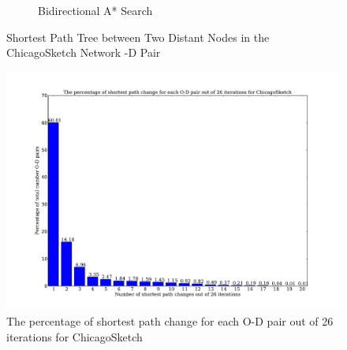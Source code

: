 \begin{figure}
\begin{subfigure}{.5\textwidth}
        \caption{Bidirectional A* Search}
        \label{fig:chicago_astar_bidirect}
    \end{subfigure}
    \vspace{1em}
    \caption{Shortest Path Tree between Two Distant Nodes in the ChicagoSketch Network -D Pair}
    \label{fig:long_sptree}
\end{figure}

\begin{figure}[H]
    \centering
    \includegraphics[width=\textwidth]{img/sp_change}
    \caption{The percentage of shortest path change for each O-D pair out of 26 iterations for ChicagoSketch}
    \label{fig:sp_change}
\end{figure}


